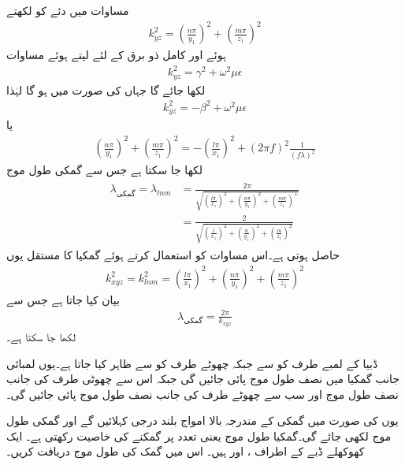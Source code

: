 مساوات  میں دئے  کو  لکھتے
\begin{align}
k_{yz}^2=\left( \frac{n \pi}{y_1}\right)^2+\left( \frac{m \pi}{z_1}\right)^2
\end{align}
ہوئے اور کامل ذو برق کے لئے  لیتے ہوئے  مساوات  
\begin{align*}
k_{yz}^2=\gamma^2+\omega^2 \mu \epsilon
\end{align*}
لکھا جائے گا جہاں  کی صورت میں  ہو گا لہٰذا
\begin{align*}
k_{yz}^2=-\beta^2+\omega^2 \mu \epsilon
\end{align*}
یا
\begin{align*}
\left( \frac{n \pi}{y_1}\right)^2+\left( \frac{m \pi}{z_1}\right)^2=-\left(\frac{l \pi}{x_1}\right)^2+\left(2\pi f\right)^2 \frac{1}{\left(f \lambda\right)^2}
\end{align*}
لکھا جا سکتا ہے جس سے گمکی طول موج
\begin{gather}
\begin{aligned}\label{مساوات_مویج_گمک_طول_موج}
\lambda_{\text{گمکی}}=\lambda_{lnm}&=
\frac{2\pi}{\sqrt{\left(\frac{l \pi}{x_1}\right)^2+\left( \frac{n \pi}{y_1}\right)^2+\left( \frac{m \pi}{z_1}\right)^+}}\\
&=\frac{2}{\sqrt{\left(\frac{l}{x_1}\right)^2+\left( \frac{n }{y_1}\right)^2+\left( \frac{m}{z_1}\right)^2}}
\end{aligned}
\end{gather}
حاصل ہوتی ہے۔اس مساوات کو استعمال کرتے ہوئے گمکیا کا مستقل  یوں
\begin{align}
k_{xyz}^2=k_{lnm}^2=\left(\frac{l \pi}{x_1}\right)^2+\left( \frac{n \pi}{y_1}\right)^2+\left( \frac{m \pi}{z_1}\right)^2
\end{align}
 بیان کیا جاتا ہے جس سے 
\begin{align}
\lambda_{\text{گمکی}}=\frac{2\pi}{k_{xyz}}
\end{align}
لکھا جا سکتا ہے۔

ڈبیا کے  لمبے طرف کو  سے  جبکہ چھوٹے طرف کو  سے ظاہر کیا جاتا ہے۔یوں لمبائی جانب گمکیا میں  نصف طول موج پائی جائیں گی جبکہ اس سے چھوٹی طرف کی جانب  نصف طول موج اور سب سے چھوٹے طرف کی جانب  نصف طول موج پائی جائیں گی۔

یوں  کی صورت میں گمکی کے مندرجہ بالا امواج بلند درجی  کہلائیں گے اور گمکی طول موج  لکھی جائے گی۔گمکیا  طول موج یعنی  تعدد پر گمکنے کی خاصیت رکھتی ہے۔ 
ایک کھوکھلے ڈبے کے اطراف ،  اور  ہیں۔ اس میں  گمک کی طول موج  دریافت کریں۔

